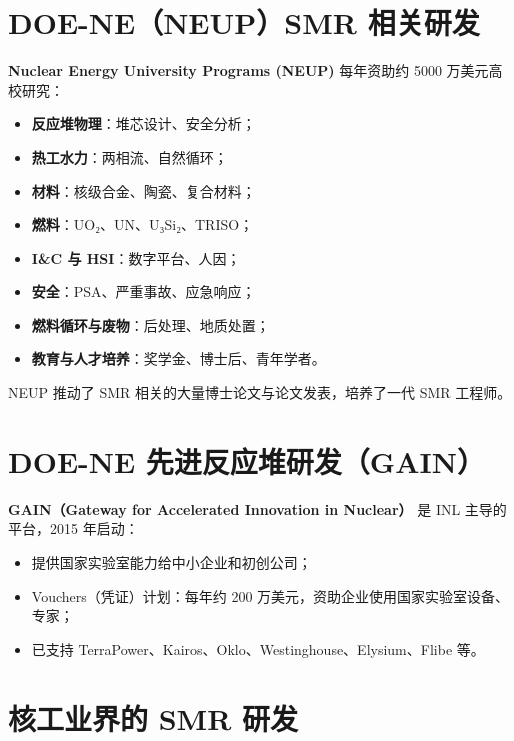 \documentclass[
  UTF8,
  scheme=plain,
  fontsize=10pt,
  openany
]{ctexbook}
\begin{document}
\section{DOE-NE（NEUP）SMR
相关研发}\label{doe-neneupsmr-ux76f8ux5173ux7814ux53d1}

\textbf{Nuclear Energy University Programs (NEUP)} 每年资助约 5000
万美元高校研究：

\begin{itemize}
\tightlist
\item
  \textbf{反应堆物理}：堆芯设计、安全分析；
\item
  \textbf{热工水力}：两相流、自然循环；
\item
  \textbf{材料}：核级合金、陶瓷、复合材料；
\item
  \textbf{燃料}：UO₂、UN、U₃Si₂、TRISO；
\item
  \textbf{I\&C 与 HSI}：数字平台、人因；
\item
  \textbf{安全}：PSA、严重事故、应急响应；
\item
  \textbf{燃料循环与废物}：后处理、地质处置；
\item
  \textbf{教育与人才培养}：奖学金、博士后、青年学者。
\end{itemize}

NEUP 推动了 SMR 相关的大量博士论文与论文发表，培养了一代 SMR 工程师。

\section{DOE-NE
先进反应堆研发（GAIN）}\label{doe-ne-ux5148ux8fdbux53cdux5e94ux5806ux7814ux53d1gain}

\textbf{GAIN（Gateway for Accelerated Innovation in Nuclear）} 是 INL
主导的平台，2015 年启动：

\begin{itemize}
\tightlist
\item
  提供国家实验室能力给中小企业和初创公司；
\item
  Vouchers（凭证）计划：每年约 200
  万美元，资助企业使用国家实验室设备、专家；
\item
  已支持 TerraPower、Kairos、Oklo、Westinghouse、Elysium、Flibe 等。
\end{itemize}

\section{核工业界的 SMR
研发}\label{ux6838ux5de5ux4e1aux754cux7684-smr-ux7814ux53d1}
\end{document}
